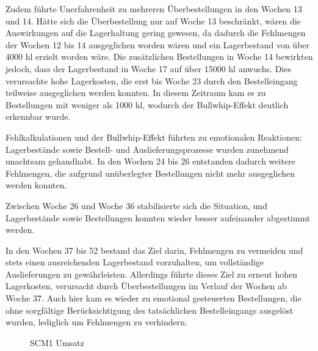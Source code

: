 \documentclass[a4paper,12pt]{article}
\begin{document}
Zudem führte Unerfahrenheit zu mehreren Überbestellungen in den Wochen 13 und 14.
Hätte sich die Überbestellung nur auf Woche 13 beschränkt, wären die Auswirkungen auf die Lagerhaltung gering gewesen,
da dadurch die Fehlmengen der Wochen 12 bis 14 ausgeglichen worden wären und ein Lagerbestand von über 4000 hl erzielt worden wäre.
Die zusätzlichen Bestellungen in Woche 14 bewirkten jedoch, dass der Lagerbestand in Woche 17 auf über 15000 hl anwuchs.
Dies verursachte hohe Lagerkosten, die erst bis Woche 23 durch den Bestelleingang teilweise ausgeglichen werden konnten.
In diesem Zeitraum kam es zu Bestellungen mit weniger als 1000 hl, wodurch der Bullwhip-Effekt deutlich erkennbar wurde.

Fehlkalkulationen und der Bullwhip-Effekt führten zu emotionalen Reaktionen: Lagerbestände sowie Bestell- und Auslieferungsprozesse wurden zunehmend unachtsam gehandhabt.
In den Wochen 24 bis 26 entstanden dadurch weitere Fehlmengen, die aufgrund unüberlegter Bestellungen nicht mehr ausgeglichen werden konnten.

Zwischen Woche 26 und Woche 36 stabilisierte sich die Situation, und Lagerbestände sowie Bestellungen konnten wieder besser aufeinander abgestimmt werden.

In den Wochen 37 bis 52 bestand das Ziel darin, Fehlmengen zu vermeiden und stets einen ausreichenden Lagerbestand vorzuhalten,
um vollständige Auslieferungen zu gewährleisten.
Allerdings führte dieses Ziel zu erneut hohen Lagerkosten, verursacht durch Überbestellungen im Verlauf der Wochen ab Woche 37.
Auch hier kam es wieder zu emotional gesteuerten Bestellungen, die ohne sorgfältige Berücksichtigung des tatsächlichen Bestelleingangs ausgelöst wurden, lediglich um Fehlmengen zu verhindern.

\begin{figure}[H]
    \centering
    \caption{SCM1 Umsatz}
    \label{fig:SCM1 Umsatz}
\end{figure}
\end{document}

